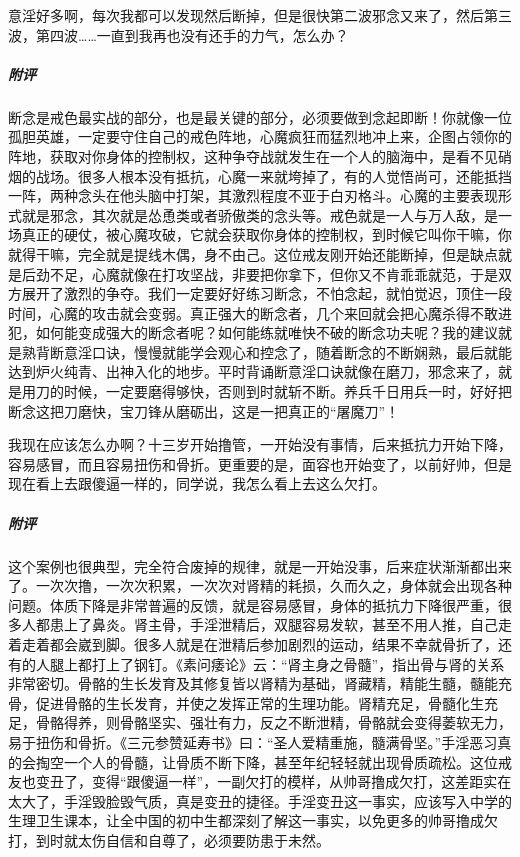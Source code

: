 \begin{case}
    意淫好多啊，每次我都可以发现然后断掉，但是很快第二波邪念又来了，然后第三波，第四波……一直到我再也没有还手的力气，怎么办？
    \subparagraph{附评} 断念是戒色最实战的部分，也是最关键的部分，必须要做到念起即断！你就像一位孤胆英雄，一定要守住自己的戒色阵地，心魔疯狂而猛烈地冲上来，企图占领你的阵地，获取对你身体的控制权，这种争夺战就发生在一个人的脑海中，是看不见硝烟的战场。很多人根本没有抵抗，心魔一来就垮掉了，有的人觉悟尚可，还能抵挡一阵，两种念头在他头脑中打架，其激烈程度不亚于白刃格斗。心魔的主要表现形式就是邪念，其次就是怂恿类或者骄傲类的念头等。戒色就是一人与万人敌，是一场真正的硬仗，被心魔攻破，它就会获取你身体的控制权，到时候它叫你干嘛，你就得干嘛，完全就是提线木偶，身不由己。这位戒友刚开始还能断掉，但是缺点就是后劲不足，心魔就像在打攻坚战，非要把你拿下，但你又不肯乖乖就范，于是双方展开了激烈的争夺。我们一定要好好练习断念，不怕念起，就怕觉迟，顶住一段时间，心魔的攻击就会变弱。真正强大的断念者，几个来回就会把心魔杀得不敢进犯，如何能变成强大的断念者呢？如何能练就唯快不破的断念功夫呢？我的建议就是熟背断意淫口诀，慢慢就能学会观心和控念了，随着断念的不断娴熟，最后就能达到炉火纯青、出神入化的地步。平时背诵断意淫口诀就像在磨刀，邪念来了，就是用刀的时候，一定要磨得够快，否则到时就斩不断。养兵千日用兵一时，好好把断念这把刀磨快，宝刀锋从磨砺出，这是一把真正的“屠魔刀”！
\end{case}

\begin{case}
    我现在应该怎么办啊？十三岁开始撸管，一开始没有事情，后来抵抗力开始下降，容易感冒，而且容易扭伤和骨折。更重要的是，面容也开始变了，以前好帅，但是现在看上去跟傻逼一样的，同学说，我怎么看上去这么欠打。
    \subparagraph{附评} 这个案例也很典型，完全符合废掉的规律，就是一开始没事，后来症状渐渐都出来了。一次次撸，一次次积累，一次次对肾精的耗损，久而久之，身体就会出现各种问题。体质下降是非常普遍的反馈，就是容易感冒，身体的抵抗力下降很严重，很多人都患上了鼻炎。肾主骨，手淫泄精后，双腿容易发软，甚至不用人推，自己走着走着都会崴到脚。很多人就是在泄精后参加剧烈的运动，结果不幸就骨折了，还有的人腿上都打上了钢钉。《素问痿论》云：“肾主身之骨髓”，指出骨与肾的关系非常密切。骨骼的生长发育及其修复皆以肾精为基础，肾藏精，精能生髓，髓能充骨，促进骨骼的生长发育，并使之发挥正常的生理功能。肾精充足，骨髓化生充足，骨骼得养，则骨骼坚实、强壮有力，反之不断泄精，骨骼就会变得萎软无力，易于扭伤和骨折。《三元参赞延寿书》曰：“圣人爱精重施，髓满骨坚。”手淫恶习真的会掏空一个人的骨髓，让骨质不断下降，甚至年纪轻轻就出现骨质疏松。这位戒友也变丑了，变得“跟傻逼一样”，一副欠打的模样，从帅哥撸成欠打，这差距实在太大了，手淫毁脸毁气质，真是变丑的捷径。手淫变丑这一事实，应该写入中学的生理卫生课本，让全中国的初中生都深刻了解这一事实，以免更多的帅哥撸成欠打，到时就太伤自信和自尊了，必须要防患于未然。
\end{case}


